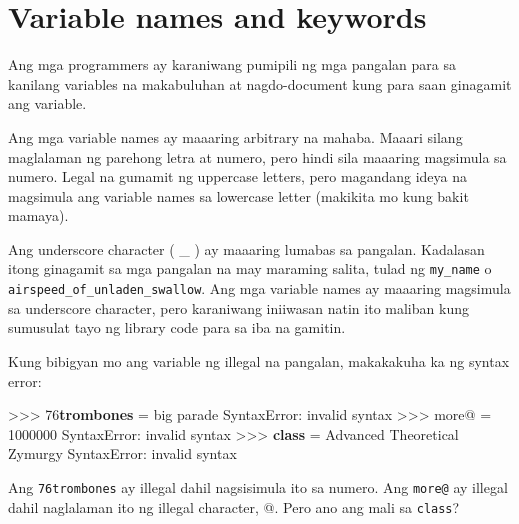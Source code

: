 \documentclass[10pt,]{book}
\newenvironment{Shaded}{}{}
\newcommand{\DecValTok}[1]{\textcolor[rgb]{0.25,0.63,0.44}{#1}}
\newcommand{\ErrorTok}[1]{\textcolor[rgb]{1.00,0.00,0.00}{\textbf{#1}}}
\newcommand{\KeywordTok}[1]{\textcolor[rgb]{0.00,0.44,0.13}{\textbf{#1}}}
\newcommand{\NormalTok}[1]{#1}
\newcommand{\OperatorTok}[1]{\textcolor[rgb]{0.40,0.40,0.40}{#1}}
\newcommand{\PreprocessorTok}[1]{\textcolor[rgb]{0.74,0.48,0.00}{#1}}
\newcommand{\StringTok}[1]{\textcolor[rgb]{0.25,0.44,0.63}{#1}}
\begin{document}
\section{Variable names and keywords}\label{variable-names-and-keywords}


Ang mga programmers ay karaniwang pumipili ng mga pangalan para sa
kanilang variables na makabuluhan at nagdo-document kung para saan
ginagamit ang variable.

Ang mga variable names ay maaaring arbitrary na mahaba. Maaari silang
maglalaman ng parehong letra at numero, pero hindi sila maaaring
magsimula sa numero. Legal na gumamit ng uppercase letters, pero
magandang ideya na magsimula ang variable names sa lowercase letter
(makikita mo kung bakit mamaya).

Ang underscore character ( \_ ) ay maaaring lumabas sa pangalan.
Kadalasan itong ginagamit sa mga pangalan na may maraming salita, tulad
ng \texttt{my\_name} o \texttt{airspeed\_of\_unladen\_swallow}. Ang mga
variable names ay maaaring magsimula sa underscore character, pero
karaniwang iniiwasan natin ito maliban kung sumusulat tayo ng library
code para sa iba na gamitin.


Kung bibigyan mo ang variable ng illegal na pangalan, makakakuha ka ng
syntax error:

\begin{Shaded}
\begin{Highlighting}[]
\OperatorTok{\textgreater{}\textgreater{}\textgreater{}} \DecValTok{76}\ErrorTok{trombones} \OperatorTok{=} \StringTok{\textquotesingle{}big parade\textquotesingle{}}
\PreprocessorTok{SyntaxError}\NormalTok{: invalid syntax}
\OperatorTok{\textgreater{}\textgreater{}\textgreater{}}\NormalTok{ more}\OperatorTok{@} \OperatorTok{=} \DecValTok{1000000}
\PreprocessorTok{SyntaxError}\NormalTok{: invalid syntax}
\OperatorTok{\textgreater{}\textgreater{}\textgreater{}} \KeywordTok{class} \OperatorTok{=} \StringTok{\textquotesingle{}Advanced Theoretical Zymurgy\textquotesingle{}}
\PreprocessorTok{SyntaxError}\NormalTok{: invalid syntax}
\end{Highlighting}
\end{Shaded}

Ang \texttt{76trombones} ay illegal dahil nagsisimula ito sa numero. Ang
\texttt{more@} ay illegal dahil naglalaman ito ng illegal character, @.
Pero ano ang mali sa \texttt{class}?
\end{document}
